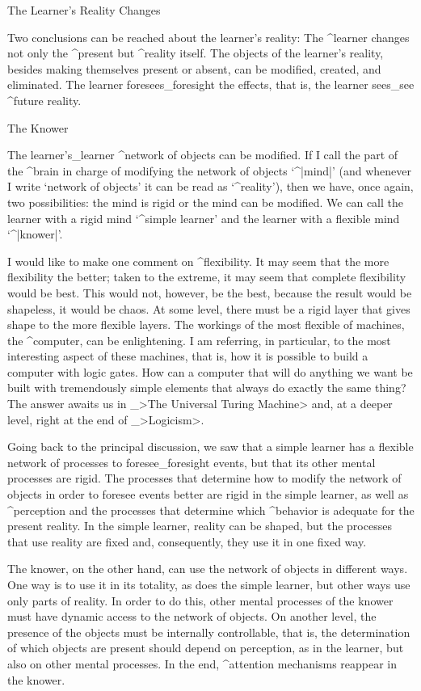 \Section The Learner's Reality Changes

Two conclusions can be reached about the learner's reality:
\beginpoints
\point The ^{learner} changes not only the ^{present} but
^{reality} itself. The objects of the learner's reality, besides making
themselves present or absent, can be modified, created, and eliminated.
\point The learner foresees_{foresight} the effects, that is, the learner
sees_{see} ^{future} reality.
\endpoints


\Section The Knower

The learner's_{learner} ^{network of objects} can be modified. If I call
the part of the ^{brain} in charge of modifying the network of objects
`^|mind|' (and whenever I write `network of objects' it can be read as
`^{reality}'), then we have, once again, two possibilities: the mind is
rigid or the mind can be modified. We can call the learner with a rigid
mind `^{simple learner}' and the learner with a flexible mind
`^|knower|'.

I would like to make one comment on ^{flexibility}. It may seem that the
more flexibility the better; taken to the extreme, it may seem that
complete flexibility would be best. This would not, however, be the
best, because the result would be shapeless, it would be chaos. At some
level, there must be a rigid layer that gives shape to the more flexible
layers. The workings of the most flexible of machines, the ^{computer},
can be enlightening. I am referring, in particular, to the most
interesting aspect of these machines, that is, how it is possible to
build a computer with logic gates. How can a computer that will do
anything we want be built with tremendously simple elements that always
do exactly the same thing? The answer awaits us in _>The Universal
Turing Machine> and, at a deeper level, right at the end of _>Logicism>.

Going back to the principal discussion, we saw that a simple learner has
a flexible network of processes to foresee_{foresight} events, but that
its other mental processes are rigid. The processes that determine how
to modify the network of objects in order to foresee events better are
rigid in the simple learner, as well as ^{perception} and the processes
that determine which ^{behavior} is adequate for the present reality. In
the simple learner, reality can be shaped, but the processes that use
reality are fixed and, consequently, they use it in one fixed way.

The knower, on the other hand, can use the network of objects in
different ways. One way is to use it in its totality, as does the simple
learner, but other ways use only parts of reality. In order to do this,
other mental processes of the knower must have dynamic access to the
network of objects. On another level, the presence of the objects must
be internally controllable, that is, the determination of which objects
are present should depend on perception, as in the learner, but also on
other mental processes. In the end, ^{attention} mechanisms reappear in
the knower.


